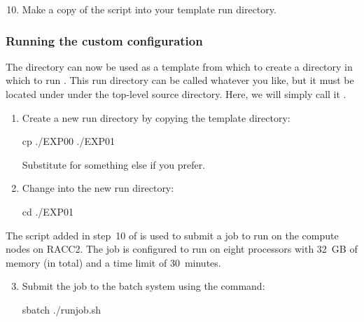 \begin{enumerate}\setcounter{enumi}{9}
    \item Make a copy of the  script into your template run directory.
\end{enumerate}


\subsubsection{Running the custom configuration}
\label{sec:tutor-running}

The directory  can now be used as a template from which to create a directory in which to run \NEMOSIcu{}.
This run directory can be called whatever you like, but it must be located under  under the top-level source directory.
Here, we will simply call it . 

\begin{enumerate}
    \item Create a new run directory by copying the template directory:

\begin{VerbatimCMD}
cp  ./EXP00 ./EXP01
\end{VerbatimCMD}

    Substitute  for something else if you prefer.

    \item Change into the new run directory:

\begin{VerbatimCMD}
cd ./EXP01
\end{VerbatimCMD}

\end{enumerate}

The script  added in step~10 of  is used to submit a job to run \NEMOSIcu{} on the compute nodes on RACC2.
The job is configured to run on eight processors with 32~GB of memory (in total) and a time limit of 30~minutes.

\begin{enumerate}\setcounter{enumi}{2}
    \item Submit the job to the batch system using the command:

\begin{VerbatimCMD}
sbatch ./runjob.sh
\end{VerbatimCMD}

\end{enumerate}

